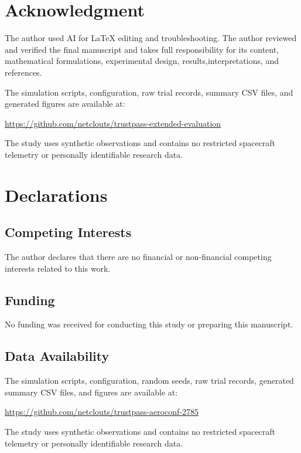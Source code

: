 \documentclass[10pt,conference]{IEEEtran}
\begin{document}
\section*{Acknowledgment}

The author used AI for \LaTeX{} editing and troubleshooting. The
author reviewed and verified the final manuscript and takes full responsibility for its content, mathematical formulations, experimental design, results,interpretations, and references. 

The simulation scripts, configuration, raw trial records, summary CSV files,
and generated figures are available at:

\url{https://github.com/netclouts/trustpass-extended-evaluation}

The study uses synthetic observations and contains no restricted spacecraft
telemetry or personally identifiable research data.

\section*{Declarations}

\subsection*{Competing Interests}

The author declares that there are no financial or non-financial competing
interests related to this work.

\subsection*{Funding}

No funding was received for conducting this study or preparing this manuscript.

\subsection*{Data Availability}

The simulation scripts, configuration, random seeds, raw trial records,
generated summary CSV files, and figures are available at:

\url{https://github.com/netclouts/trustpass-aeroconf-2785}

The study uses synthetic observations and contains no restricted spacecraft
telemetry or personally identifiable research data.



\end{document}
